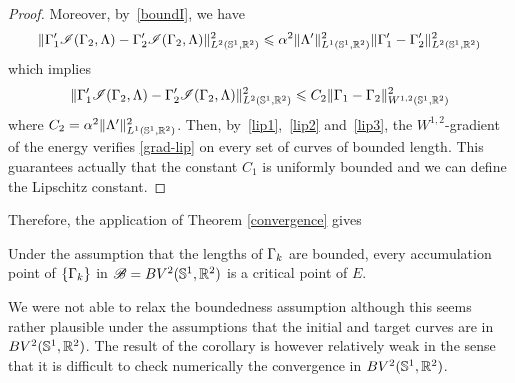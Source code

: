 \begin{proof}
Moreover, by~\eqref{boundI}, we have  
$$\|\Gamma'_1\mathcal{I}(\Gamma_2,\Lambda) - \Gamma'_2\mathcal{I}(\Gamma_2,\Lambda)\|^2_{L^2(\mathbb{S}^1,\mathbb{R}^2)}  
 	 \leqslant \alpha^2  \| \Lambda' \|_{L^1(\mathbb{S}^1,\mathbb{R}^2)}^2 \|\Gamma'_1 - \Gamma'_2\|_{L^2(\mathbb{S}^1,\mathbb{R}^2)}^2$$
which implies 
\begin{equation}\label{lip3}
  \displaystyle{\|\Gamma'_1\mathcal{I}(\Gamma_2,\Lambda) - \Gamma'_2\mathcal{I}(\Gamma_2,\Lambda)\|^2_{L^2(\mathbb{S}^1,\mathbb{R}^2)}\leqslant C_2\|\Gamma_1 - \Gamma_2\|_{W^{1,2}(\mathbb{S}^1,\mathbb{R}^2)}^2}
\end{equation}
where $C_2=\alpha^2  \| \Lambda' \|_{L^1(\mathbb{S}^1,\mathbb{R}^2)}^2$. Then, by~\eqref{lip1},~\eqref{lip2} and~\eqref{lip3}, the $W^{1,2}$-gradient of the energy verifies \eqref{grad-lip} on every 
set of curves of bounded length. This guarantees actually that the constant $C_1$ is uniformly bounded and we can define the Lipschitz constant. 
\end{proof}

Therefore, the application of Theorem \ref{convergence} gives
\begin{cor} 
Under the assumption that the lengths of $\Gamma_k$ are bounded, every accumulation point of $\{\Gamma_k\}$ in $\mathcal{B} = BV^{2}(\mathbb{S}^1,\mathbb{R}^2)$ is a  critical point of $E$.
\end{cor}

\begin{rem}
We were not able to relax the boundedness assumption although this seems rather plausible under the assumptions that the initial and target curves are in $BV^2(\mathbb{S}^1,{\mathbb R}^2)$.
The result of the corollary is however relatively weak in the sense that it is difficult to  check numerically the convergence in $BV^2(\mathbb{S}^1,{\mathbb R}^2)$.
\end{rem}

